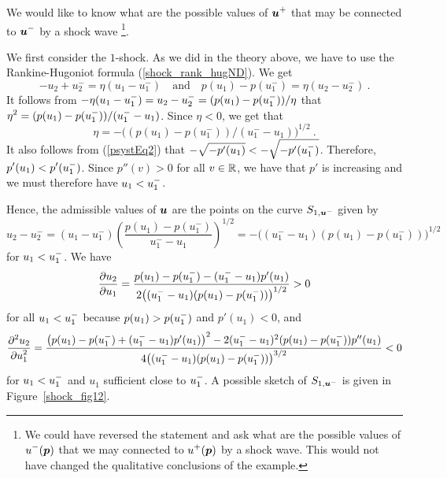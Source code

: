 \begin{egg}
We would like to know what are the possible values of
$\displaystyle {\bm{u}}^+$ that may be connected to
$\displaystyle {\bm{u}}^-$ by a shock wave
\footnote{We could have reversed the statement and ask what are the
possible values of $\displaystyle u^-({\bm{p}})$ that we may connected to
$\displaystyle u^+({\bm{p}})$ by a shock wave.  This would not have changed the
qualitative conclusions of the example.}.

 We first consider the $1$-shock.  As we did in the
theory above, we have to use the Rankine-Hugoniot formula
(\ref{shock_rank_hugND}).  We get
\begin{equation} \label{psystEq4}
-u_2 + u^-_2 = \eta ( u_1 - u^-_1) \quad \text{and} 
\quad p(u_1) - p(u^-_1) = \eta ( u_2 - u^-_2 ) \ .
\end{equation}
It follows from
$\displaystyle -\eta ( u_1 - u^-_1) = u_2 - u^-_2 = (p(u_1) - p(u^-_1))/\eta$
that $\displaystyle \eta^2 = (p(u_1) - p(u^-_1))/(u^-_1 - u_1)$.
Since $\eta < 0$, we get that
\begin{equation}  \label{psystEq7}
\eta = - \big((p(u_1) - p(u^-_1))/(u^-_1 - u_1)\big)^{1/2} \ .
\end{equation}
It also follows from (\ref{psystEq2}) that
$\displaystyle -\sqrt{-p'(u_1)} < -\sqrt{-p'(u^-_1)}$.  Therefore,
$\displaystyle p'(u_1) < p'(u^-_1)$.  Since
$p''(v) > 0$ for all $v \in \mathbb{R}$, we have that $p'$ is increasing and
we must therefore have $\displaystyle u_1 < u^-_1$.

Hence, the admissible values of ${\bm{u}}$ are the points on the curve
$S_{1,{\bm{u}}^-}$ given by
\[
u_2 - u^-_2 = ( u_1 - u^-_1)
\left(\frac{p(u_1) - p(u^-_1)}{u^-_1 - u_1}\right)^{1/2}
= -\big( (u^-_1 - u_1) (p(u_1) - p(u^-_1)) \big)^{1/2}
\]
for $\displaystyle u_1 < u^-_1$.  We have
\[
\frac{\partial{u_2}}{\partial u_1} = \frac{p(u_1) - p(u^-_1) - (u^-_1 - u_1)p'(u_1)}
{2\big( (u^-_1 - u_1) (p(u_1) - p(u^-_1)) \big)^{1/2}} > 0
\]
for all $\displaystyle u_1 < u^-_1$ because
$\displaystyle p(u_1) > p(u^-_1)$ and $p'(u_1)<0$, and
\[
\frac{\displaystyle \partial^{2}{u_2}} {\displaystyle \partial u_1^{2}} = 
\frac{\big(p(u_1) - p(u^-_1) + (u^-_1 - u_1)p'(u_1)\big)^2
- 2 (u^-_1-u_1)^2 (p(u_1) - p(u^-_1)) p''(u_1)}
{4\big((u^-_1 - u_1)(p(u_1)-p(u^-_1))\big)^{3/2}}
< 0
\]
for $\displaystyle u_1 < u^-_1$ and $u_1$ sufficient close to
$\displaystyle u^-_1$.  A possible
sketch of $S_{1,{\bm{u}}^-}$ is given in Figure~\ref{shock_fig12}.


\end{egg}
